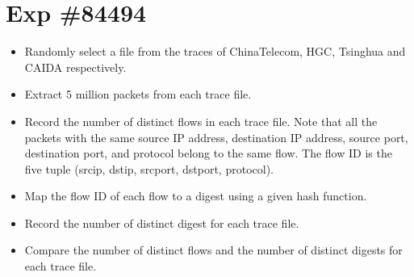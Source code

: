 \documentclass{article}
\begin{document}
\section*{Exp \#84494}
\begin{itemize}
	\item Randomly select a file from the traces of ChinaTelecom, HGC, Tsinghua and CAIDA respectively. 
	\item Extract 5 million packets from each trace file.
	\item Record the number of distinct flows in each trace file. Note that all the packets with the same source IP address, destination IP address, source port, destination port, and protocol belong to the same flow. The flow ID is the five tuple (srcip, dstip, srcport, dstport, protocol).
	\item Map the flow ID of each flow to a digest using a given hash function.
	\item Record the number of distinct digest for each trace file. 
	\item Compare the number of distinct flows and the number of distinct digests for each trace file.
\end{itemize}
\end{document}
